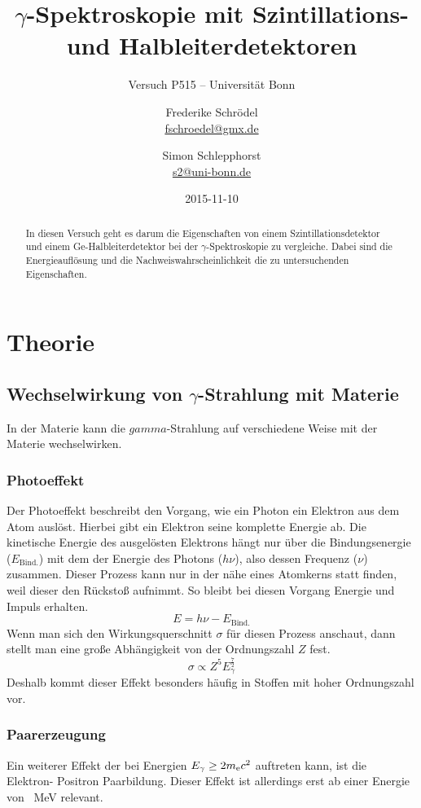 \documentclass[11pt, ngerman, fleqn, DIV=15, headinclude, BCOR=2cm]{scrreprt}
\title{$\gamma$-Spektroskopie mit Szintillations- und Halbleiterdetektoren}
\subtitle{Versuch P515 -- Universität Bonn}
\author{
	Frederike Schrödel \\
	\small{\href{mailto:fschroedel@gmx.de}{fschroedel@gmx.de}}
	\and
	Simon Schlepphorst \\
	\small{\href{mailto:s2@uni-bonn.de}{s2@uni-bonn.de}}
}
\date{2015-11-10}
\begin{document}
\maketitle

\begin{abstract}
In diesen Versuch geht es darum die Eigenschaften von einem
Szintillationsdetektor und einem Ge-Halbleiterdetektor bei der
$\gamma$-Spektroskopie zu vergleiche.
Dabei sind die Energieauflösung und die Nachweiswahrscheinlichkeit die
zu untersuchenden Eigenschaften.
\end{abstract}


\tableofcontents

\chapter{Theorie}

\section{Wechselwirkung von $\gamma$-Strahlung mit Materie}
In der Materie kann die $gamma$-Strahlung auf verschiedene Weise mit der
Materie wechselwirken.

\subsection{Photoeffekt}
Der Photoeffekt beschreibt den Vorgang, wie ein Photon ein Elektron aus dem
Atom auslöst. 
Hierbei gibt ein Elektron seine komplette Energie ab.
Die kinetische Energie des ausgelösten Elektrons hängt nur über die
Bindungsenergie ($E_\text{Bind.}$) mit dem der Energie des Photons ($h\nu$), also dessen Frequenz ($\nu$) zusammen.
Dieser Prozess kann nur in der nähe eines Atomkerns statt finden, weil dieser
den Rückstoß aufnimmt.
So bleibt bei diesen Vorgang Energie und Impuls erhalten. 
\[ 
    E = h\nu - E_\text{Bind.}
\]
Wenn man sich den Wirkungsquerschnitt $\sigma$ für diesen Prozess anschaut,
dann stellt man eine große Abhängigkeit von der Ordnungszahl $Z$ fest.
\[
    \sigma \propto Z^5 E_\gamma^{\frac 72}
\]
Deshalb kommt dieser Effekt besonders häufig in Stoffen mit hoher Ordnungszahl
vor.

\subsection{Paarerzeugung}
Ein weiterer Effekt der bei Energien $E_\gamma \ge 2m_\text ec^2$ auftreten
kann, ist die Elektron- Positron Paarbildung.
Dieser Effekt ist allerdings erst ab einer Energie von
\SI{}{\mega\electronvolt} relevant.
\end{document}
